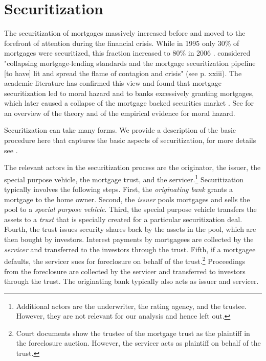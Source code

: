 \documentclass[11pt,twopage]{article}
\begin{document}

\section{Securitization}
\label{sec:securitization}


The securitization of mortgages massively increased before and moved
to the forefront of attention during the financial crisis. While in
1995 only 30\% of mortgages were securitized, this fraction increased
to 80\% in 2006 \cite[p. 19]{dewatripont2010balancing}. \cite{angelides2011financial} considered "collapsing
mortgage-lending standards and the mortgage securitization pipeline
[to have] lit and spread the flame of contagion and crisis" (see p. xxiii).  The
academic literature has confirmed this view and found that mortgage
securitization led to moral hazard and to banks excessively granting
mortgages, which later caused a collapse of the mortgage backed
securities market \citep{mian2009consequences,dewatripont2010balancing,keys2008did}.
See \cite{gorton2015securitization} for an overview of
the theory and of the empirical evidence for moral hazard.

Securitization can take many forms. We provide a description of the basic
procedure here that captures the basic aspects of securitization, 
for more details see \cite{cetorelli2012role,gorton2015securitization}.

The relevant actors in the securitization process are the originator, the issuer,
the special purpose vehicle, the mortgage trust, and the servicer.\footnote{Additional
actors are the underwriter, the rating agency, and the trustee. However, they are not
relevant for our analysis and hence left out.}
Securitization typically involves the following steps. 
First, the \emph{originating
bank} grants a mortgage to the home owner. Second, the \emph{issuer} pools mortgages
and sells the pool to a \emph{special purpose vehicle}. Third, the special purpose
vehicle transfers the assets to a \emph{trust} that is specially created for
a particular securitization deal. Fourth, the trust issues security shares
back by the assets in the pool, which are then bought by investors.
Interest payments by mortgagees are collected by the \emph{servicer} and
transferred to the investors through the trust. Fifth, if a mortgagee
defaults, the servicer sues for foreclosure on behalf of the trust.\footnote{Court documents
show the trustee of the mortgage trust as the plaintiff in the foreclosure auction.
However, the servicer acts as plaintiff on behalf of the trust.} Proceedings
from the foreclosure are collected by the servicer and transferred
to investors through the trust. The originating bank typically also acts
as issuer and servicer.
\end{document}
